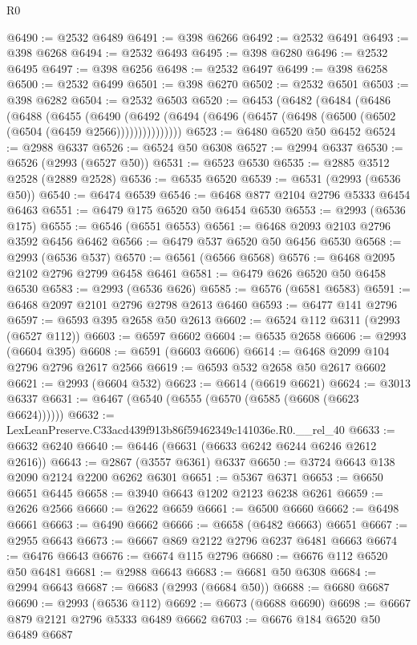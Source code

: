 \begin{lexlean}{R0}
\begin{coremodule}
@6490 := @2532 @6489
@6491 := @398 @6266
@6492 := @2532 @6491
@6493 := @398 @6268
@6494 := @2532 @6493
@6495 := @398 @6280
@6496 := @2532 @6495
@6497 := @398 @6256
@6498 := @2532 @6497
@6499 := @398 @6258
@6500 := @2532 @6499
@6501 := @398 @6270
@6502 := @2532 @6501
@6503 := @398 @6282
@6504 := @2532 @6503
@6520 := @6453
    (@6482
      (@6484
        (@6486
          (@6488
            (@6455
              (@6490
                (@6492 (@6494 (@6496 (@6457 (@6498 (@6500 (@6502 (@6504 (@6459 @2566)))))))))))))))
@6523 := @6480 @6520 @50 @6452
@6524 := @2988 @6337
@6526 := @6524 @50 @6308
@6527 := @2994 @6337
@6530 := @6526 (@2993 (@6527 @50))
@6531 := @6523 @6530
@6535 := @2885 @3512 @2528 (@2889 @2528)
@6536 := @6535 @6520
@6539 := @6531 (@2993 (@6536 @50))
@6540 := @6474 @6539
@6546 := @6468 @877 @2104 @2796 @5333 @6454 @6463
@6551 := @6479 @175 @6520 @50 @6454 @6530
@6553 := @2993 (@6536 @175)
@6555 := @6546 (@6551 @6553)
@6561 := @6468 @2093 @2103 @2796 @3592 @6456 @6462
@6566 := @6479 @537 @6520 @50 @6456 @6530
@6568 := @2993 (@6536 @537)
@6570 := @6561 (@6566 @6568)
@6576 := @6468 @2095 @2102 @2796 @2799 @6458 @6461
@6581 := @6479 @626 @6520 @50 @6458 @6530
@6583 := @2993 (@6536 @626)
@6585 := @6576 (@6581 @6583)
@6591 := @6468 @2097 @2101 @2796 @2798 @2613 @6460
@6593 := @6477 @141 @2796
@6597 := @6593 @395 @2658 @50 @2613
@6602 := @6524 @112 @6311 (@2993 (@6527 @112))
@6603 := @6597 @6602
@6604 := @6535 @2658
@6606 := @2993 (@6604 @395)
@6608 := @6591 (@6603 @6606)
@6614 := @6468 @2099 @104 @2796 @2796 @2617 @2566
@6619 := @6593 @532 @2658 @50 @2617 @6602
@6621 := @2993 (@6604 @532)
@6623 := @6614 (@6619 @6621)
@6624 := @3013 @6337
@6631 := @6467 (@6540 (@6555 (@6570 (@6585 (@6608 (@6623 @6624))))))
@6632 := LexLeanPreserve.C33acd439f913b86f59462349c141036e.R0.__rel_40
@6633 := @6632 @6240
@6640 := @6446 (@6631 (@6633 @6242 @6244 @6246 @2612 @2616))
@6643 := @2867 (@3557 @6361) @6337
@6650 := @3724 @6643 @138 @2090 @2124 @2200 @6262 @6301
@6651 := @5367 @6371
@6653 := @6650 @6651 @6445
@6658 := @3940 @6643 @1202 @2123 @6238 @6261
@6659 := @2626 @2566
@6660 := @2622 @6659
@6661 := @6500 @6660
@6662 := @6498 @6661
@6663 := @6490 @6662
@6666 := @6658 (@6482 @6663) @6651
@6667 := @2955 @6643
@6673 := @6667 @869 @2122 @2796 @6237 @6481 @6663
@6674 := @6476 @6643
@6676 := @6674 @115 @2796
@6680 := @6676 @112 @6520 @50 @6481
@6681 := @2988 @6643
@6683 := @6681 @50 @6308
@6684 := @2994 @6643
@6687 := @6683 (@2993 (@6684 @50))
@6688 := @6680 @6687
@6690 := @2993 (@6536 @112)
@6692 := @6673 (@6688 @6690)
@6698 := @6667 @879 @2121 @2796 @5333 @6489 @6662
@6703 := @6676 @184 @6520 @50 @6489 @6687

\end{coremodule}
\end{lexlean}
